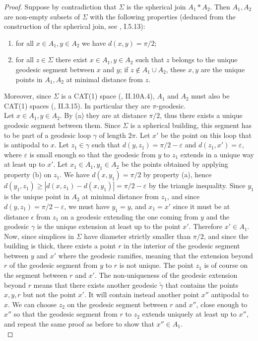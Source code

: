 \documentclass{article}
\theoremstyle{definition}
\theoremstyle{remark}
\theoremstyle{plain}
\begin{document}
\begin{proof}
    Suppose by contradiction that $\Sigma$ is the spherical join $A_1*A_2$. Then $A_1,A_2$ are non-empty subsets of $\Sigma$ with the following properties (deduced from the construction of the spherical join, see \cite{bh}, I.5.13):
    \begin{enumerate}[label=(\alph*)]
        \item for all $x\in A_1, y\in A_2$ we have $d(x,y)=\pi/2$;
        \item for all $z\in\Sigma$ there exist $x\in A_1,y\in A_2$ such that $z$ belongs to the unique geodesic segment between $x$ and $y$; if $z\not\in A_1\cup A_2$, these $x,y$ are the unique points in $A_1,A_2$ at minimal distance from $z$.
    \end{enumerate}
    Moreover, since $\Sigma$ is a CAT(1) space (\cite{bh}, II.10A.4), $A_1$ and $A_2$ must also be CAT(1) spaces (\cite{bh}, II.3.15). In particular they are $\pi$-geodesic. \\

    Let $x\in A_1, y\in A_2$. By (a) they are at distance $\pi/2$, thus there exists a unique geodesic segment between them. Since $\Sigma$ is a spherical building, this segment has to be part of a geodesic loop $\gamma$ of length $2\pi$. Let $x'$ be the point on this loop that is antipodal to $x$. Let $z_1\in\gamma$ such that $d(y,z_1)=\pi/2-\varepsilon$ and $d(z_1,x')=\varepsilon$, where $\varepsilon$ is small enough so that the geodesic from $y$ to $z_1$ extends in a unique way at least up to $x'$. Let $x_1\in A_1,y_1\in A_2$ be the points obtained by applying property (b) on $z_1$. We have $d(x,y_1)=\pi/2$ by property (a), hence $d(y_1,z_1)\geq|d(x,z_1)-d(x,y_1)|=\pi/2-\varepsilon$ by the triangle inequality. Since $y_1$ is the unique point in $A_2$ at minimal distance from $z_1$, and since $d(y,z_1)=\pi/2-\varepsilon$, we must have $y_1=y$, and $x_1=x'$ since it must be at distance $\epsilon$ from $z_1$ on a geodesic extending the one coming from $y$ and the geodesic $\gamma$ is the unique extension at least up to the point $x'$. Therefore $x'\in A_1$. \\

    Now, since simplices in $\Sigma$ have diameter strictly smaller than $\pi/2$, and since the building is thick, there exists a point $r$ in the interior of the geodesic segment between $y$ and $x'$ where the geodesic ramifies, meaning that the extension beyond $r$ of the geodesic segment from $y$ to $r$ is not unique. The point $z_1$ is of course on the segment between $r$ and $x'$. The non-uniqueness of the geodesic extension beyond $r$ means that there exists another geodesic $\widetilde{\gamma}$ that contains the points $x,y,r$ but not the point $x'$. It will contain instead another point $x''$ antipodal to $x$. We can choose $z_2$ on the geodesic segment between $r$ and $x''$, close enough to $x''$ so that the geodesic segment from $r$ to $z_2$ extends uniquely at least up to $x''$, and repeat the same proof as before to show that $x''\in A_1$. \\
    

\end{proof}
\end{document}
